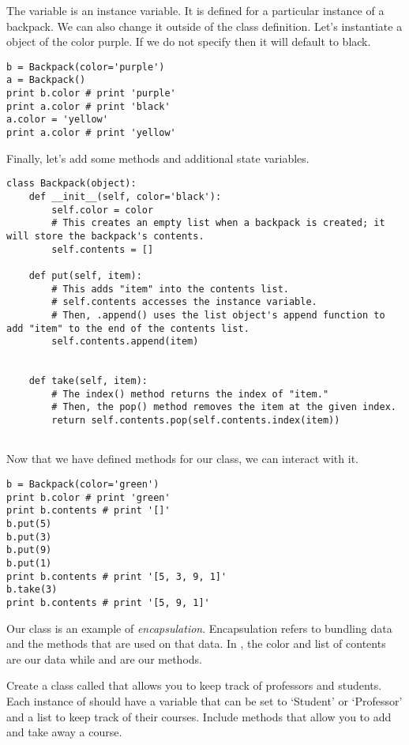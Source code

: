 The variable  is an instance variable. It is defined for a particular instance of a backpack.
We can also change it outside of the class definition.
Let's instantiate a  object of the color purple.
If we do not specify then it will default to black.

\begin{lstlisting}
b = Backpack(color='purple')
a = Backpack()
print b.color # print 'purple'
print a.color # print 'black'
a.color = 'yellow'
print a.color # print 'yellow'
\end{lstlisting}


Finally, let's add some methods and additional state variables.

\begin{lstlisting}
class Backpack(object):
    def __init__(self, color='black'):
        self.color = color
        # This creates an empty list when a backpack is created; it will store the backpack's contents.
        self.contents = []

    def put(self, item):
        # This adds "item" into the contents list.
        # self.contents accesses the instance variable.
        # Then, .append() uses the list object's append function to add "item" to the end of the contents list.
        self.contents.append(item)


    def take(self, item):
        # The index() method returns the index of "item."
        # Then, the pop() method removes the item at the given index.
        return self.contents.pop(self.contents.index(item))


\end{lstlisting}

Now that we have defined methods for our  class, we can interact with it.


\begin{lstlisting}
b = Backpack(color='green')
print b.color # print 'green'
print b.contents # print '[]'
b.put(5)
b.put(3)
b.put(9)
b.put(1)
print b.contents # print '[5, 3, 9, 1]'
b.take(3)
print b.contents # print '[5, 9, 1]'
\end{lstlisting}

Our  class is an example of \emph{encapsulation}.
Encapsulation refers to bundling data and the methods that are used on that data.
In , the color and list of contents are our data while  and  are our methods.

\begin{problem}
Create a class called  that allows you to keep track of professors and students.
Each instance of  should have a variable that can be set to `Student' or `Professor' and a list to keep track of their courses.
Include methods that allow you to add and take away a course.
\label{prob:School}
\end{problem}

